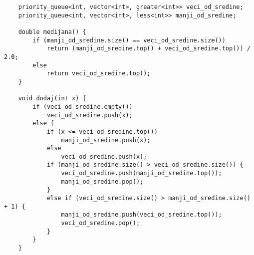 \documentclass{article}
\begin{document}
\begin{lstlisting}
    priority_queue<int, vector<int>, greater<int>> veci_od_sredine;
    priority_queue<int, vector<int>, less<int>> manji_od_sredine;

    double medijana() {
        if (manji_od_sredine.size() == veci_od_sredine.size())
            return (manji_od_sredine.top() + veci_od_sredine.top()) / 2.0;
        else
            return veci_od_sredine.top();
    }

    void dodaj(int x) {
        if (veci_od_sredine.empty())
            veci_od_sredine.push(x);
        else {
            if (x <= veci_od_sredine.top())
                manji_od_sredine.push(x);
            else
                veci_od_sredine.push(x);
            if (manji_od_sredine.size() > veci_od_sredine.size()) {
                veci_od_sredine.push(manji_od_sredine.top());
                manji_od_sredine.pop();
            } 
            else if (veci_od_sredine.size() > manji_od_sredine.size() + 1) {
                manji_od_sredine.push(veci_od_sredine.top());
                veci_od_sredine.pop();
            }
        }
    }
\end{lstlisting}
\end{document}
